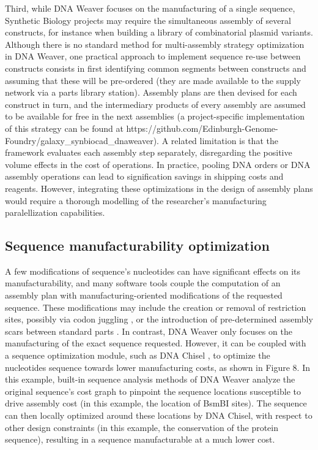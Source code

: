 Third, while DNA Weaver focuses on the manufacturing of a single sequence, Synthetic Biology projects may require the simultaneous assembly of several constructs, for instance when building a library of combinatorial plasmid variants. Although there is no standard method for multi-assembly strategy optimization in DNA Weaver, one practical approach to implement sequence re-use between constructs consists in first identifying common segments between constructs and assuming that these will be pre-ordered (they are made available to the supply network via a parts library station). Assembly plans are then devised for each construct in turn, and the intermediary products of every assembly are assumed to be available for free in the next assemblies (a project-specific implementation of this strategy can be found at https://github.com/Edinburgh-Genome-Foundry/galaxy_synbiocad_dnaweaver). A related limitation is that the framework evaluates each assembly step separately, disregarding the positive volume effects in the cost of operations. In practice, pooling DNA orders or DNA assembly operations can lead to signification savings in shipping costs and reagents. However, integrating these optimizations in the design of assembly plans would require a thorough modelling of the researcher's manufacturing paralellization capabilities.

\subsection{Sequence manufacturability optimization}

A few modifications of sequence's nucleotides can have significant effects on its manufacturability, and many software tools couple the computation of an assembly plan with manufacturing-oriented modifications of the requested sequence. These modifications may include the creation or removal of restriction sites, possibly via codon juggling \citep{Richardson2006,Oberortner2017}, or the introduction of pre-determined assembly scars between standard parts \citep{Vazquez-Vilar2017}. In contrast, DNA Weaver only focuses on the manufacturing of the exact sequence requested. However, it can be coupled with a sequence optimization module, such as DNA Chisel \citep{zulkower2019dna}, to optimize the nucleotides sequence towards lower manufacturing costs, as shown in Figure 8. In this example, built-in sequence analysis methods of DNA Weaver analyze the original sequence's cost graph to pinpoint the sequence locations susceptible to drive assembly cost (in this example, the location of BsmBI sites). The sequence can then locally optimized around these locations by DNA Chisel, with respect to other design constraints (in this example, the conservation of the protein sequence), resulting in a sequence manufacturable at a much lower cost.


